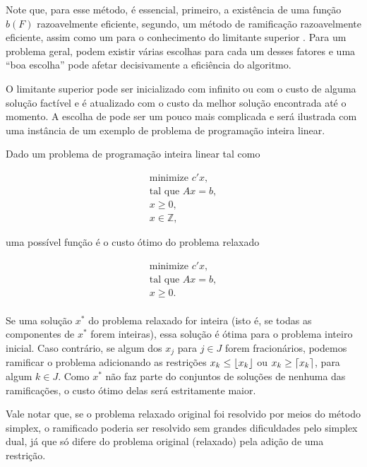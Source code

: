 Note que, para esse método, é essencial, primeiro, a existência de uma função $b(F)$ razoavelmente
eficiente, segundo, um método de ramificação razoavelmente eficiente, assim como um para o
conhecimento do limitante superior . Para um problema geral, podem existir várias
escolhas para cada um desses fatores e uma ``boa escolha'' pode afetar decisivamente a eficiência
do algoritmo.

O limitante superior  pode ser inicializado com infinito ou com o custo de alguma
solução factível e é atualizado com o custo da melhor solução encontrada até o momento. A escolha de
 pode ser um pouco mais complicada e será ilustrada com uma instância de um exemplo de
problema de programação inteira linear.

Dado um problema de programação inteira linear tal como

\begin{equation}
  \begin{split}
    \text{minimize } c'x, \\
    \text{tal que }  Ax = b,\\
             x \geq 0,\\
             x \in \mathbb{Z},
  \end{split}\label{eq:inteiro}
\end{equation}

\noindent uma possível função  é o custo ótimo do problema relaxado

\begin{equation}
  \begin{split}
    \text{minimize } c'x, \\
    \text{tal que }  Ax = b,\\
             x \geq 0.\\
  \end{split}\label{eq:inteiro}
\end{equation}

Se uma solução $x^*$ do problema relaxado for inteira (isto é, se todas as componentes de $x^*$ forem
inteiras), essa solução é ótima para o problema inteiro inicial. Caso contrário, se algum dos $x_j$ para $j
\in J$ forem fracionários, podemos ramificar o problema adicionando as restrições $x_k \leq
\floor*{x_k}$ ou $x_k \geq \ceil*{x_k}$, para algum $k \in J$. Como $x^*$ não faz parte do
conjuntos de soluções de nenhuma das ramificações, o custo ótimo delas será estritamente maior.

Vale notar que, se o problema relaxado original foi resolvido por meios do método simplex, o
ramificado poderia ser resolvido sem grandes dificuldades pelo simplex dual, já que só difere do
problema original (relaxado) pela adição de uma restrição.

